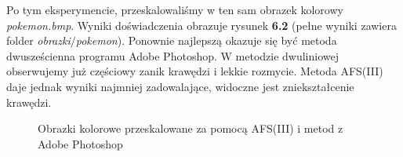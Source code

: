 Po tym eksperymencie, przeskalowaliśmy w ten sam obrazek kolorowy \textit{pokemon.bmp}.
Wyniki doświadczenia obrazuje rysunek \textbf{6.2} (pełne wyniki zawiera folder \textit{obrazki$\slash$pokemon}).
Ponownie najlepszą okazuje się być metoda dwusześcienna programu Adobe Photoshop. W metodzie dwuliniowej
obserwujemy już częściowy zanik krawędzi i lekkie rozmycie. Metoda AFS(III) daje jednak
wyniki najmniej zadowalające, widoczne jest zniekształcenie krawędzi.
\begin{figure}[h!tb]
\begin{center}
\caption{Obrazki kolorowe przeskalowane za pomocą AFS(III) i metod z Adobe Photoshop}
\end{center}
\end{figure}

